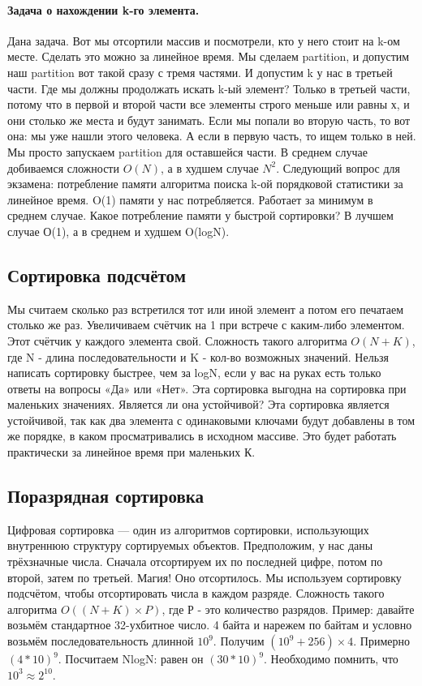\documentclass[12pt]{article}
\begin{document}
\paragraph{Задача о нахождении k-го элемента.}
Дана задача. Вот мы отсортили массив и посмотрели, кто у него стоит на k-ом месте. Сделать это можно за линейное время. Мы сделаем partition, и допустим наш partition вот такой сразу с тремя частями. И допустим k у нас в третьей части. Где мы должны продолжать искать k-ый элемент? Только в третьей части, потому что в первой и второй части все элементы строго меньше или равны х, и они столько же места и будут занимать. Если мы попали во вторую часть, то вот она: мы уже нашли этого человека. А если в первую часть, то ищем только в ней. Мы просто запускаем partition для оставшейся части. В среднем случае добиваемся сложности $O(N)$, а в худшем случае $N^2$. Следующий вопрос для экзамена: потребление памяти алгоритма поиска k-ой порядковой статистики за линейное время. O(1) памяти у нас потребляется. Работает за минимум в среднем случае. Какое потребление памяти у быстрой сортировки? В лучшем случае О(1), а в среднем и худшем O(logN). 
\subsection*{Сортировка подсчётом}
Мы считаем сколько раз встретился тот или иной элемент а потом его печатаем столько же раз. Увеличиваем счётчик на 1 при встрече с каким-либо элементом. Этот счётчик у каждого элемента свой. Сложность такого алгоритма $O(N+K)$, где N - длина последовательности и K - кол-во возможных значений. Нельзя написать сортировку быстрее, чем за logN, если у вас на руках есть только ответы на вопросы «Да» или «Нет». Эта сортировка выгодна на сортировка при маленьких значениях. Является ли она устойчивой? Эта сортировка является устойчивой, так как два элемента с одинаковыми ключами будут добавлены в том же порядке, в каком просматривались в исходном массиве. Это будет работать практически за линейное время при маленьких К. 
\subsection*{Поразрядная сортировка}
Цифровая сортировка — один из алгоритмов сортировки, использующих внутреннюю структуру сортируемых объектов. Предположим, у нас даны трёхзначные числа. Сначала отсортируем их по последней цифре, потом по второй, затем по третьей. Магия! Оно отсортилось. Мы используем сортировку подсчётом, чтобы отсортировать числа в каждом разряде. Сложность такого алгоритма $O((N+K)\times P)$, где Р - это количество разрядов. Пример: давайте возьмём стандартное 32-ухбитное число. 4 байта и нарежем по байтам и условно возьмём последовательность длинной $10^9$. Получим $(10^9 + 256) \times 4$. Примерно $(4 * 10)^9$. Посчитаем NlogN: равен он $(30 * 10)^9$. Необходимо помнить, что $10^3 \approx 2^{10}$.
\end{document}
